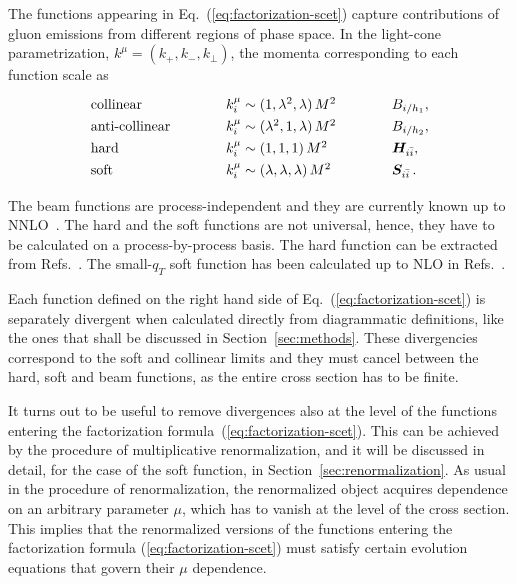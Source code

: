 \documentclass[a4paper,11pt]{article}
\newcommand{\iibar}{{i \bar i}}
\numberwithin{equation}{section}
\begin{document}
The functions appearing in Eq.~(\ref{eq:factorization-scet}) capture
contributions of gluon emissions from different regions of phase space. In the
light-cone parametrization, $k^\mu = (k_+, k_-, k_\perp)$, the momenta
corresponding to each function scale as
%
\begin{equation}
  {\renewcommand{\arraystretch}{1.3}%
  \begin{array}{l@{\qquad \qquad}l@{\qquad \qquad}l}
   \text{collinear}  
       & k_i^\mu \sim (1,\lambda^2,\lambda)\, M^2   & B_{i/h_1},  \\
   \text{anti-collinear} 
       & k_i^\mu \sim (\lambda^2, 1, \lambda)\, M^2 & B_{i/h_2},  \\
   \text{hard}           
       & k_i^\mu \sim (1,1,1)\, M^2                 & \bm{H}_\iibar,    \\
   \text{soft}           
       & k_i^\mu \sim (\lambda,\lambda, \lambda)\, M^2 & \bm{S}_\iibar \,.   
  \end{array}
  }
\end{equation}

The beam functions are process-independent and they are currently known  up to
NNLO~\cite{Gehrmann:2012ze,Gehrmann:2014yya}.
%
The hard and the soft functions are not universal, hence, they have to be
calculated on a process-by-process basis.  The hard function can be extracted
from Refs.~\cite{Czakon:2008zk, Baernreuther:2013caa}.  The small-$q_T$ soft
function has been calculated up to NLO in Refs.~\cite{Li:2013mia,
Catani:2014qha}.

Each function defined on the right hand side of
Eq.~(\ref{eq:factorization-scet}) is separately divergent when calculated
directly from diagrammatic definitions, like the ones that shall be discussed in
Section~\ref{sec:methods}.  These divergencies correspond to the soft and
collinear limits and they must cancel between the hard, soft and beam functions,
as the entire cross section has to be finite. 

It turns out to be useful to remove divergences also at the level of the
functions entering the factorization formula~(\ref{eq:factorization-scet}). This
can be achieved by the procedure of multiplicative renormalization, and it will
be discussed in detail, for the case of the soft function, in
Section~\ref{sec:renormalization}.
%
As usual in the procedure of renormalization, the renormalized object acquires
dependence on an arbitrary parameter $\mu$, which has to vanish at the level of
the cross section. This implies that the renormalized versions of the functions
entering the factorization formula (\ref{eq:factorization-scet}) must satisfy
certain evolution equations that govern their $\mu$ dependence.
\end{document}
